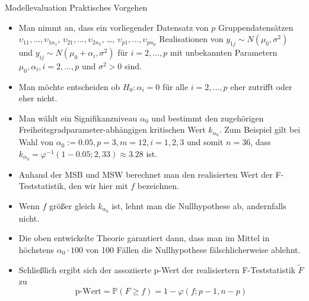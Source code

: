 \documentclass[
  8pt,
  ignorenonframetext,
]{beamer}
\begin{document}
\begin{frame}{Modellevaluation}
\protect\hypertarget{modellevaluation-19}{}
Praktisches Vorgehen \footnotesize

\begin{itemize}
\item
  \justifying Man nimmt an, dass ein vorliegender Datensatz von \(p\)
  Gruppendatensätzen \(\upsilon_{11}, ...,\upsilon_{1n_1}\),
  \(\upsilon_{21}, ...,\upsilon_{2n_2}\), \ldots,
  \(\upsilon_{p1}, ...,\upsilon_{pn_p}\) Realisationen von
  \(y_{1j} \sim N(\mu_0,\sigma^2)\) und
  \(y_{ij} \sim N(\mu_0 + \alpha_i,\sigma^2)\) für \(i = 2,...,p\) mit
  unbekannten Parametern \(\mu_0, \alpha_i, i = 2,...,p\) und
  \(\sigma^2>0\) sind.
\item
  Man möchte entscheiden ob \(H_0 : \alpha_i = 0\) für alle
  \(i = 2,...,p\) eher zutrifft oder eher nicht.
\item
  Man wählt ein Signifikanzniveau \(\alpha_0\) und bestimmt den
  zugehörigen Freiheitsgradparameter-abhängigen kritischen Wert
  \(k_{\alpha_0}\). Zum Beispiel gilt bei Wahl von
  \(\alpha_0 := 0.05, p = 3, m = 12, i = 1,2,3\) und somit \(n = 36\),
  dass \(k_{\alpha_0} = \varphi^{-1}(1 - 0.05; 2, 33) \approx 3.28\)
  ist.
\item
  Anhand der MSB und MSW berechnet man den realisierten Wert der
  F-Teststatistik, den wir hier mit \(f\) bezeichnen.
\item
  Wenn \(f\) größer gleich \(k_{\alpha_0}\) ist, lehnt man die
  Nullhypothese ab, andernfalls nicht.
\item
  Die oben entwickelte Theorie garantiert dann, dass man im Mittel in
  höchstens \(\alpha_0 \cdot 100\) von 100 Fällen die Nullhypothese
  fälschlicherweise ablehnt.
\item
  Schließlich ergibt sich der assoziierte p-Wert der realisiertern
  F-Teststatistik \(\tilde{F}\) zu \begin{equation}
  \mbox{p-Wert} = \mathbb{P}(F \ge f) = 1 - \varphi(f; p-1, n-p)
  \end{equation}
\end{itemize}
\end{frame}
\end{document}

